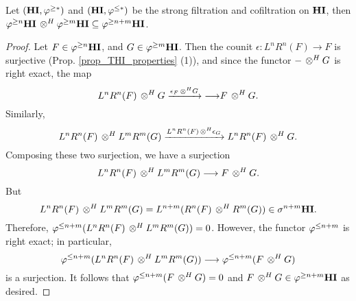 \begin{prop}\label{prop_tensor_and_tfilt}
Let $(\mathbf{HI}, \varphi^{\geq *})$ and $(\mathbf{HI}, \varphi^{\leq *})$ be the strong 
filtration and cofiltration on $\mathbf{HI}$, then $\varphi^{\geq n}\mathbf{HI} \,\otimes^H 
\varphi^{\geq m}\mathbf{HI} \subseteq \varphi^{\geq n + m}\mathbf{HI}$.
\end{prop}
\begin{proof}
Let $F \in \varphi^{\geq n}\mathbf{HI}$, and $G \in \varphi^{\geq m}\mathbf{HI}$. Then the counit 
$\epsilon: L^nR^n(F) \to F$ is surjective (Prop. 
\ref{prop_THI_properties} (1)), and since the functor $- \,\otimes^H G$ 
is right exact, the map
\[
L^nR^n(F) \,\otimes^H G \xrightarrow{\epsilon_F \,\otimes^H G}{\longrightarrow} F \,\otimes^H G.
\]
Similarly,
\[
L^nR^n(F) \,\otimes^H L^mR^m(G) \xrightarrow{L^nR^n(F) \,\otimes^H \epsilon_G}
L^nR^n(F) \,\otimes^H G.
\]
Composing these two surjection, we have a surjection
\[
L^nR^n(F) \,\otimes^H L^mR^m(G) \longrightarrow F \,\otimes^H G.
\]
But 
\[
L^nR^n(F) \,\otimes^H L^mR^m(G) = L^{n + m}(R^n(F) \,\otimes^H R^m(G)) \in
\sigma^{n + m}\mathbf{HI}.
\]
Therefore, $\varphi^{\leq n + m}(L^nR^n(F) \,\otimes^H L^mR^m(G)) = 0$. However,
the functor $\varphi^{\leq n + m}$ is right exact; in particular, 
\[
\varphi^{\leq n + m}(L^nR^n(F) \,\otimes^H L^mR^m(G)) \longrightarrow
   \varphi^{\leq n + m}(F \,\otimes^H G)
\]
is a surjection. It follows that $\varphi^{\leq n + m}(F \,\otimes^H G) = 0$ and
$F \,\otimes^H G \in \varphi^{\geq n + m}\mathbf{HI}$ as desired.
\end{proof}
